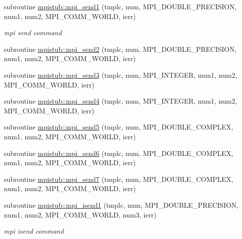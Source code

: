 \begin{DoxyCompactItemize}
\item 
subroutine \mbox{\hyperlink{namespacempistub_aa276a91b8fd09a5bf247b20692731dd8}{mpistub\+::mpi\+\_\+send1}} (tmplc, num, M\+P\+I\+\_\+\+D\+O\+U\+B\+L\+E\+\_\+\+P\+R\+E\+C\+I\+S\+I\+ON, num1, num2, M\+P\+I\+\_\+\+C\+O\+M\+M\+\_\+\+W\+O\+R\+LD, ierr)
\begin{DoxyCompactList}\small\item\em mpi send command \end{DoxyCompactList}\item 
subroutine \mbox{\hyperlink{namespacempistub_a6c4e68898245f7cb86fa2854a852a0e4}{mpistub\+::mpi\+\_\+send2}} (tmplc, num, M\+P\+I\+\_\+\+D\+O\+U\+B\+L\+E\+\_\+\+P\+R\+E\+C\+I\+S\+I\+ON, num1, num2, M\+P\+I\+\_\+\+C\+O\+M\+M\+\_\+\+W\+O\+R\+LD, ierr)
\item 
subroutine \mbox{\hyperlink{namespacempistub_aa2236bd3615856981e15e75fd85bce13}{mpistub\+::mpi\+\_\+send3}} (tmplc, num, M\+P\+I\+\_\+\+I\+N\+T\+E\+G\+ER, num1, num2, M\+P\+I\+\_\+\+C\+O\+M\+M\+\_\+\+W\+O\+R\+LD, ierr)
\item 
subroutine \mbox{\hyperlink{namespacempistub_a1c957856f9f59c126b5a38101eb016b2}{mpistub\+::mpi\+\_\+send4}} (tmplc, num, M\+P\+I\+\_\+\+I\+N\+T\+E\+G\+ER, num1, num2, M\+P\+I\+\_\+\+C\+O\+M\+M\+\_\+\+W\+O\+R\+LD, ierr)
\item 
subroutine \mbox{\hyperlink{namespacempistub_a46c983917eca3492fa5ad9eadbb25b2e}{mpistub\+::mpi\+\_\+send5}} (tmplc, num, M\+P\+I\+\_\+\+D\+O\+U\+B\+L\+E\+\_\+\+C\+O\+M\+P\+L\+EX, num1, num2, M\+P\+I\+\_\+\+C\+O\+M\+M\+\_\+\+W\+O\+R\+LD, ierr)
\item 
subroutine \mbox{\hyperlink{namespacempistub_a1a0436836f0028c31fba295fbbe17859}{mpistub\+::mpi\+\_\+send6}} (tmplc, num, M\+P\+I\+\_\+\+D\+O\+U\+B\+L\+E\+\_\+\+C\+O\+M\+P\+L\+EX, num1, num2, M\+P\+I\+\_\+\+C\+O\+M\+M\+\_\+\+W\+O\+R\+LD, ierr)
\item 
subroutine \mbox{\hyperlink{namespacempistub_a572c98a51712ea28686e837f62e0a660}{mpistub\+::mpi\+\_\+send7}} (tmplc, num, M\+P\+I\+\_\+\+D\+O\+U\+B\+L\+E\+\_\+\+C\+O\+M\+P\+L\+EX, num1, num2, M\+P\+I\+\_\+\+C\+O\+M\+M\+\_\+\+W\+O\+R\+LD, ierr)
\item 
subroutine \mbox{\hyperlink{namespacempistub_a2aebc613876246484fb3daea092c2abe}{mpistub\+::mpi\+\_\+isend1}} (tmplc, num, M\+P\+I\+\_\+\+D\+O\+U\+B\+L\+E\+\_\+\+P\+R\+E\+C\+I\+S\+I\+ON, num1, num2, M\+P\+I\+\_\+\+C\+O\+M\+M\+\_\+\+W\+O\+R\+LD, num3, ierr)
\begin{DoxyCompactList}\small\item\em mpi isend command \end{DoxyCompactList}\item 

\end{DoxyCompactItemize}
